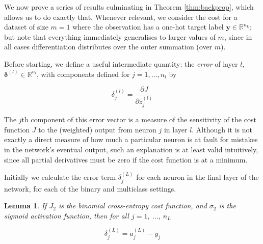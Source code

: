 \documentclass{article}[11pt]
\newtheorem{lemma}{Lemma}
\begin{document}
        We now prove a series of results culminating in Theorem \ref{thm:backprop}, which allows us to do exactly that. Whenever relevant, we consider the cost for a dataset of size $m = 1$ where the observation has a one-hot target label $\mathbf{y} \in \mathbb{R}^{n_L}$; but note that everything immediately generalises to larger values of $m$, since in all cases differentiation distributes over the outer summation (over $m$).
        
        Before starting, we define a useful intermediate quantity: the \textit{error} of layer $l$, $\boldsymbol{\delta}^{(l)} \in \mathbb{R}^{n_l}$, with components defined for $j = 1, \ldots, n_l$ by
        
        $$
        \delta^{(l)}_j = \frac{\partial J}{\partial z^{(l)}_j}
        $$
        
        The $j$th component of this error vector is a measure of the sensitivity of the cost function $J$ to the (weighted) output from neuron $j$ in layer $l$. Although it is not exactly a direct measure of how much a particular neuron is at fault for mistakes in the network's eventual output, such an explanation is at least valid intuitively, since all partial derivatives must be zero if the cost function is at a minimum.
        
        Initially we calculate the error term $\delta^{(L)}_j$ for each neuron in the final layer of the network, for each of the binary and multiclass settings.
        
        
        \begin{lemma}
            
            If $J_2$ is the binomial cross-entropy cost function, and $\sigma_2$ is the sigmoid activation function, then for all $j = 1, \ \ldots, \ n_L$
            
            $$
            \delta^{(L)}_j = a^{(L)}_j - y_j
            $$
            
        \end{lemma}
        
\end{document}
